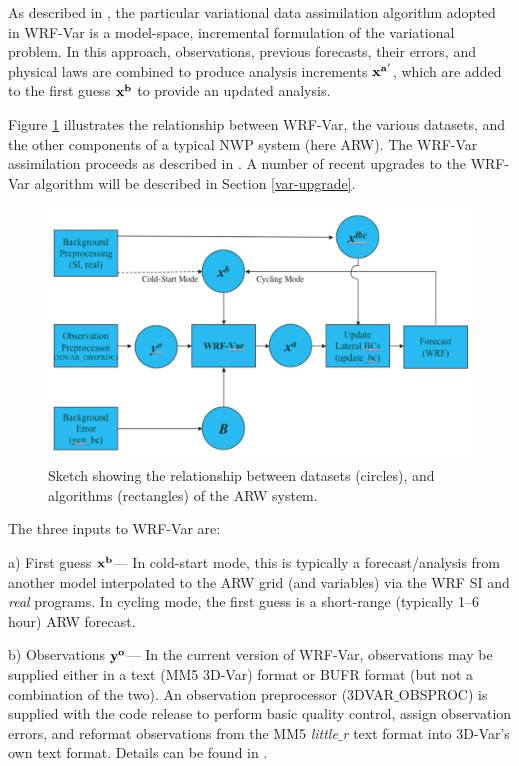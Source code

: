 As described in \citet{barker04}, the particular variational data
assimilation algorithm adopted in WRF-Var is a model-space, incremental
formulation of the variational problem.  In this approach, observations,
previous forecasts, their errors, and physical laws are combined to
produce analysis increments ${\bf x^{a'}}$, which are added to the first
guess ${\bf x^{b}}$ to provide an updated analysis.

Figure \ref{var-sketch} illustrates the relationship between WRF-Var,
the various datasets, and the other components of a typical NWP system
(here ARW). The WRF-Var assimilation proceeds as described in
\citet{barker04}. A number of recent upgrades to the WRF-Var algorithm
will be described in Section \ref{var-upgrade}.

%
%
\begin{figure}
  \centering
  \includegraphics[width=6.5in]{figures/var-sketch.pdf}
  \caption{\label{var-sketch}Sketch showing the relationship between datasets (circles), 
           and algorithms (rectangles) of the ARW system.}
\end{figure}

The three inputs to WRF-Var are: 

\vspace{0.5cm}

a) First guess ${\bf x^{b}}$--- In cold-start mode, this is typically a
forecast/analysis from another model interpolated to the ARW grid (and variables) via the 
WRF SI and {\it real} programs. In cycling mode, the first guess 
is a short-range (typically 1--6 hour) ARW forecast. 

\vspace{0.5cm}

b) Observations ${\bf y^{o}}$--- In the current version of WRF-Var, observations may be 
supplied either in a text (MM5 3D-Var) format or BUFR format (but not a 
combination of the two). An observation preprocessor (3DVAR$\_$OBSPROC) 
is supplied with the code release to perform basic quality control, assign 
observation errors, and reformat observations from the MM5 {\it little$\_$r} text 
format into 3D-Var's own text format. Details can be found in \citet{barker03, barker04}.

